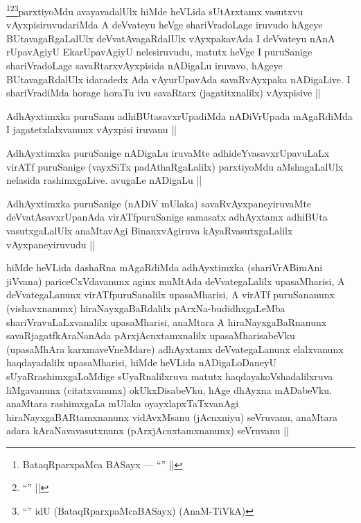 \begin{artha}
\footnote{BataqRparxpaMca BASayx --- ``\stext'' ||}\footnote{``\stext'' ||}\footnote{``\stext'' idU (BataqRparxpaMcaBASayx) (AnaM-TiVkA)}parxtiyoMdu avayavadalUlx hiMde heVLida sUtArxtamx vasutxvu vAyxpisiruvudariMda A deVvateyu heVge shariVradoLage iruvudo hAgeye BUtavagaRgaLalUlx deVvatAvagaRdalUlx vAyxpakavAda I deVvateyu nAnA rUpavAgiyU EkarUpavAgiyU nelesiruvudu, matutx heVge I puruSanige shariVradoLage savaRtarxvAyxpisida nADigaLu iruvavo, hAgeye BUtavagaRdalUlx idaradedx Ada vAyurUpavAda savaRvAyxpaka nADigaLive. I shariVradiMda horage horaTu ivu savaRtarx (jagatitxnalilx) vAyxpisive ||
\end{artha}

\begin{artha}
AdhAyxtimxka puruSanu adhiBUtasavxrUpadiMda nADiVrUpada mAgaRdiMda I jagatetxlalxvanunx vAyxpisi iruvanu ||
\end{artha}


\begin{artha}
AdhAyxtimxka puruSanige nADigaLu iruvaMte adhideYvasavxrUpavuLaLx virATf puruSanige (vayxSiTx padAthaRgaLalilx) parxtiyoMdu aMshagaLalUlx nelasida rashimxgaLive. avugaLe nADigaLu ||
\end{artha}

\begin{artha}
AdhAyxtimxka puruSanige (nADiV mUlaka) savaRvAyxpaneyiruvaMte deVvatAsavxrUpanAda virATfpuruSanige samasatx adhAyxtamx adhiBUta vasutxgaLalUlx anaMtavAgi BinanxvAgiruva kAyaRvasutxgaLalilx vAyxpaneyiruvudu ||
\end{artha}


\begin{artha}
hiMde heVLida dashaRna mAgaRdiMda adhAyxtimxka (shariVrABimAni jiVvana) pariceCxVdavanunx aginx muMtAda deVvategaLalilx upasaMharisi, A deVvategaLanunx virATfpuruSanalilx upasaMharisi, A virATf puruSananunx (vishavxnanunx) hiraNayxgaBaRdalilx pArxNa-budidhxgaLeMba shariVravuLaLxvanalilx upasaMharisi, anaMtara A hiraNayxgaBaRnanunx savaRjagatfkAraNanAda pArxjAcnxtamxnalilx upasaMharisabeVku (upasaMhAra karxmaveVneMdare) adhAyxtamx deVvategaLanunx elalxvanunx haqdayadalilx upasaMharisi, hiMde heVLida nADigaLoDaneyU sUyaRrashimxgaLoMdige sUyaRnalilxruva matutx haqdayakoVshadalilxruva liMgavanunx (citatxvanunx) okUkxDisabeVku, hAge dhAyxna mADabeVku. anaMtara rashimxgaLa mUlaka oyayxlapxTaTxvanAgi hiraNayxgaBARtamxnanunx vidAvxMsanu (jAcnxniyu) seVruvanu, anaMtara adara kAraNavavasutxnunx (pArxjAcnxtamxnanunx) seVruvanu ||
\end{artha}

